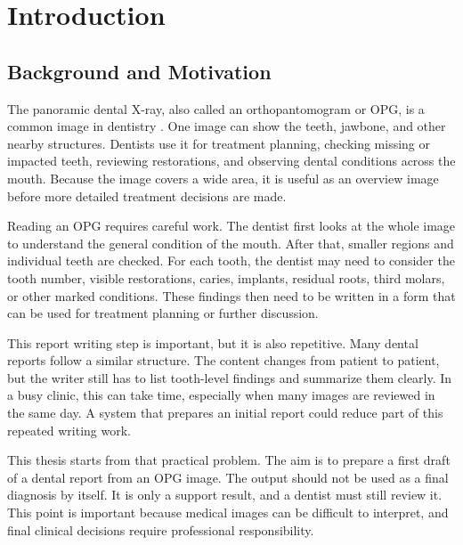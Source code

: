 \documentclass[a4paper,12pt]{report}
\begin{document}
\vspace{1cm}


\newpage
{} 
\setcounter{page}{2}  



\tableofcontents 
\listoffigures       
\listoftables     

\chapter{Introduction}
\section{Background and Motivation}
The panoramic dental X-ray, also called an orthopantomogram or OPG, is a common image in dentistry \cite{inredd_pan924_2025}. One image can show the teeth, jawbone, and other nearby structures. Dentists use it for treatment planning, checking missing or impacted teeth, reviewing restorations, and observing dental conditions across the mouth. Because the image covers a wide area, it is useful as an overview image before more detailed treatment decisions are made.

Reading an OPG requires careful work. The dentist first looks at the whole image to understand the general condition of the mouth. After that, smaller regions and individual teeth are checked. For each tooth, the dentist may need to consider the tooth number, visible restorations, caries, implants, residual roots, third molars, or other marked conditions. These findings then need to be written in a form that can be used for treatment planning or further discussion.

This report writing step is important, but it is also repetitive. Many dental reports follow a similar structure. The content changes from patient to patient, but the writer still has to list tooth-level findings and summarize them clearly. In a busy clinic, this can take time, especially when many images are reviewed in the same day. A system that prepares an initial report could reduce part of this repeated writing work.

This thesis starts from that practical problem. The aim is to prepare a first draft of a dental report from an OPG image. The output should not be used as a final diagnosis by itself. It is only a support result, and a dentist must still review it. This point is important because medical images can be difficult to interpret, and final clinical decisions require professional responsibility.
\end{document}

